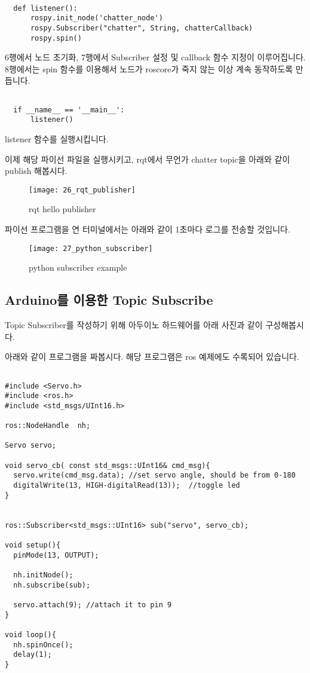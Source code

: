 \documentclass[11pt,fleqn]{book} %
\begin{document}
\begin{verbatim}

  def listener():
      rospy.init_node('chatter_node')
      rospy.Subscriber("chatter", String, chatterCallback)
      rospy.spin()

\end{verbatim}

6행에서 노드 초기화, 7행에서 Subscriber 설정 및 callback 함수 지정이 이루어집니다.
8행에서는 spin 함수를 이용해서 노드가 roscore가 죽지 않는 이상 계속 동작하도록 만듭니다.

\begin{verbatim}

  if __name__ == '__main__':
      listener()

\end{verbatim}

listener 함수를 실행시킵니다.

이제 해당 파이선 파일을 실행시키고, rqt에서 무언가 chatter topic을 아래와 같이 publish 해봅시다.

\begin{figure}[h]
\centering\texttt{[image: 26\_rqt\_publisher]}
\caption{rqt hello publisher}
\end{figure}

파이선 프로그램을 연 터미널에서는 아래와 같이 1초마다 로그를 전송할 것입니다.

\begin{figure}[h]
\centering\texttt{[image: 27\_python\_subscriber]}
\caption{python subscriber example}
\end{figure}

\subsection{Arduino를 이용한 Topic Subscribe}

Topic Subscriber를 작성하기 위해 아두이노 하드웨어를 아래 사진과 같이 구성해봅시다.

아래와 같이 프로그램을 짜봅시다. 해당 프로그램은 ros 예제에도 수록되어 있습니다.

\begin{verbatim}

#include <Servo.h>
#include <ros.h>
#include <std_msgs/UInt16.h>

ros::NodeHandle  nh;

Servo servo;

void servo_cb( const std_msgs::UInt16& cmd_msg){
  servo.write(cmd_msg.data); //set servo angle, should be from 0-180
  digitalWrite(13, HIGH-digitalRead(13));  //toggle led
}


ros::Subscriber<std_msgs::UInt16> sub("servo", servo_cb);

void setup(){
  pinMode(13, OUTPUT);

  nh.initNode();
  nh.subscribe(sub);

  servo.attach(9); //attach it to pin 9
}

void loop(){
  nh.spinOnce();
  delay(1);
}

\end{verbatim}
\end{document}
